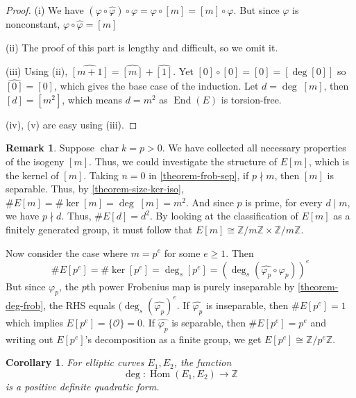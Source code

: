\documentclass[12pt]{article}
\newtheorem{corollary}{Corollary}[subsection]
\theoremstyle{remark}
\theoremstyle{definition}
\newtheorem{remark}{Remark}[subsection]
\newcommand{\Z}[0]{\mathbb{Z}}
\newcommand{\ecO}[0]{\mathcal O}
\newcommand{\Hom}[0]{\operatorname{Hom}}
\newcommand{\End}[0]{\operatorname{End}}
\begin{document}
        \begin{proof}
            (i) We have $(\varphi\circ\hat\varphi)\circ\varphi=\varphi\circ[m]=[m]\circ\varphi$. But since $\varphi$ is nonconstant, $\varphi\circ\hat\varphi=[m]$
            
            (ii) The proof of this part is lengthy and difficult, so we omit it.
            
            (iii) Using (ii), $\widehat{[m+1]}=\widehat{[m]}+\widehat{[1]}$. Yet $[0]\circ[0]=[0]=[\deg[0]]$ so $\widehat{[0]}=[0]$, which gives the base case of the induction. Let $d=\deg\;[m]$, then $[d]=[m^2]$, which means $d=m^2$ as $\End(E)$ is torsion-free.
            
            (iv), (v) are easy using (iii).
        \end{proof}
        \begin{remark}\label{remark-torsion-struct}
            Suppose $\operatorname{char} k=p>0$. We have collected all necessary properties of the isogeny $[m]$. Thus, we could investigate the structure of $E[m]$, which is the kernel of $[m]$. Taking $n=0$ in \autoref{theorem-frob-sep}, if $p\nmid m$, then $[m]$ is separable. Thus, by \autoref{theorem-size-ker-iso}, $\# E[m]=\#\ker[m]=\deg\;[m]=m^2$. And since $p$ is prime, for every $d\mid m$, we have $p\nmid d$. Thus, $\# E[d]=d^2$. By looking at the classification of $E[m]$ as a finitely generated group, it must follow that $E[m]\cong\Z/m\Z\times\Z/m\Z$.
            
            Now consider the case where $m=p^e$ for some $e\geqslant 1$. Then 
            \[\# E[p^e]=\#\ker [p^e]=\deg_s[p^e]=\left(\deg_s(\hat{\varphi_p}\circ\varphi_p)\right)^e\]
            But since $\varphi_p$, the $p$th power Frobenius map is purely inseparable by \autoref{theorem-deg-frob}, the RHS equals $(\deg_s(\hat{\varphi_p})^e$. If $\hat{\varphi_p}$ is inseparable, then $\# E[p^e]=1$ which implies $E[p^e]=\{\ecO\}=0$. If $\hat{\varphi_p}$ is separable, then $\# E[p^e]=p^e$ and writing out $E[p^e]$'s decomposition as a finite group, we get $E[p^e]\cong \Z/p^e\Z$.
        \end{remark}
        \begin{corollary}\label{corollary-deg-pos-quadratic}
            For elliptic curves $E_1, E_2$, the function
            \[\deg:\Hom(E_1,E_2)\to\Z\]
            is a positive definite quadratic form.
        \end{corollary}
\end{document}
